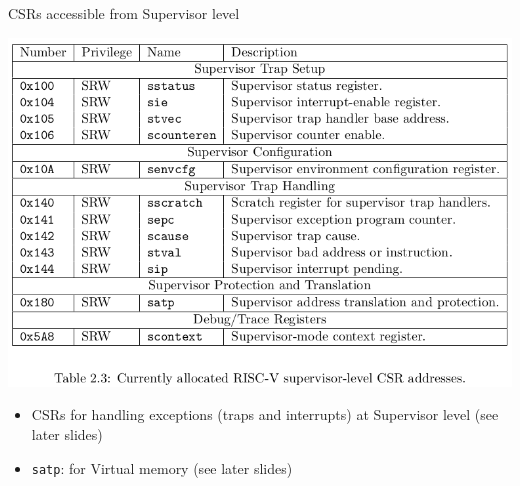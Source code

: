 \documentclass{article}
\begin{document}
\begin{center}
  {\Huge
    CSRs accessible from Supervisor level}

  \vspace*{0.2in}

  \begin{minipage}{9in}\LARGE
    \begin{center}
      \includegraphics[width=7in]{Figs/CSRs_Supervisor.png}
    \end{center}

    \begin{itemize}
    \item CSRs for handling exceptions (traps and interrupts) at Supervisor level (see later slides)

    \item {\tt satp}: for Virtual memory (see later slides)
    \end{itemize}
  \end{minipage}

\end{center}

\clearpage

\end{document}
